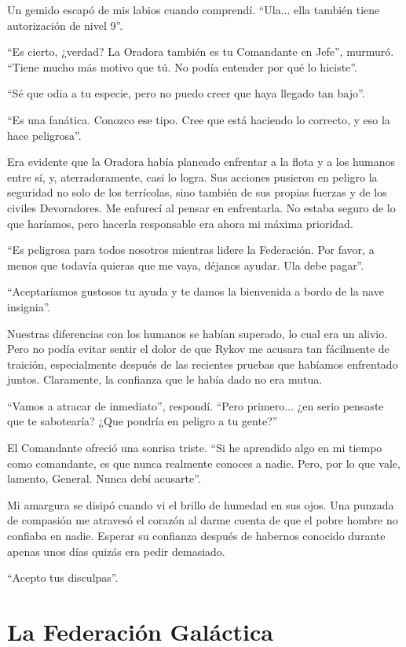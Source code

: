 \documentclass[spanish,12pt,a4paper,oneside,titlepage]{book}
\begin{document}
    Un gemido escapó de mis labios cuando comprendí. ``Ula... ella también tiene autorización de nivel 9''.

    ``Es cierto, ¿verdad? La Oradora también es tu Comandante en Jefe'', murmuró. ``Tiene mucho más motivo que tú. No podía entender por qué lo hiciste''.

    ``Sé que odia a tu especie, pero no puedo creer que haya llegado tan bajo''.

    ``Es una fanática. Conozco ese tipo. Cree que está haciendo lo correcto, y eso la hace peligrosa''.

    Era evidente que la Oradora había planeado enfrentar a la flota y a los humanos entre sí, y, aterradoramente, casi lo logra. Sus acciones pusieron en peligro la seguridad no solo de los terrícolas, sino también de sus propias fuerzas y de los civiles Devoradores. Me enfurecí al pensar en enfrentarla. No estaba seguro de lo que haríamos, pero hacerla responsable era ahora mi máxima prioridad.

    ``Es peligrosa para todos nosotros mientras lidere la Federación. Por favor, a menos que todavía quieras que me vaya, déjanos ayudar. Ula debe pagar''.

    ``Aceptaríamos gustosos tu ayuda y te damos la bienvenida a bordo de la nave insignia''.

    Nuestras diferencias con los humanos se habían superado, lo cual era un alivio. Pero no podía evitar sentir el dolor de que Rykov me acusara tan fácilmente de traición, especialmente después de las recientes pruebas que habíamos enfrentado juntos. Claramente, la confianza que le había dado no era mutua.

    ``Vamos a atracar de inmediato'', respondí. ``Pero primero... ¿en serio pensaste que te sabotearía? ¿Que pondría en peligro a tu gente?''

    El Comandante ofreció una sonrisa triste. ``Si he aprendido algo en mi tiempo como comandante, es que nunca realmente conoces a nadie. Pero, por lo que vale, lamento, General. Nunca debí acusarte''.

    Mi amargura se disipó cuando vi el brillo de humedad en sus ojos. Una punzada de compasión me atravesó el corazón al darme cuenta de que el pobre hombre no confiaba en nadie. Esperar su confianza después de habernos conocido durante apenas unos días quizás era pedir demasiado.

    ``Acepto tus disculpas''.

    \part{La Federación Galáctica}
\end{document}
